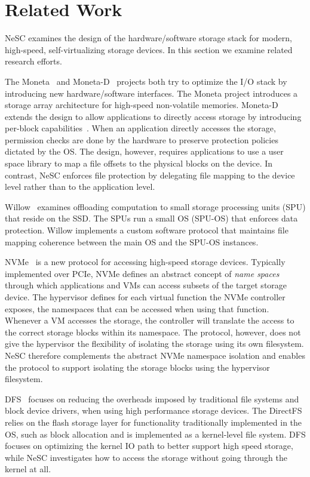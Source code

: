 \chapter{Related Work}
\label{chap:related}

NeSC examines the design of the hardware/software storage stack for modern, high-speed, self-virtualizing storage devices. In this section we examine related research efforts.

The Moneta~\cite{caulfield10moneta} and Moneta-D~\cite{caulfield12moneta-d} projects both try to optimize the I/O stack by introducing new hardware/software interfaces.
The Moneta project introduces a storage array architecture for high-speed non-volatile memories. Moneta-D extends the design to allow applications
to directly access storage by introducing per-block capabilities~\cite{levy1984capability}. When an application directly accesses the storage, permission checks are done by the hardware to preserve protection policies dictated by the OS.
The design, however, requires applications to use a user space library to map a file offsets to the physical blocks on the device.
In contrast, NeSC enforces file protection by delegating file mapping to the device level rather than to the application level.

Willow~\cite{seshadri2014willow} examines offloading computation to small storage processing units (SPU) that reside on the SSD. The SPUs run a small OS (SPU-OS) that enforces data protection. Willow implements a custom software protocol that maintains file mapping coherence between the main OS and the SPU-OS instances.

NVMe~\cite{nvme} is a new protocol for accessing high-speed storage devices. Typically implemented over PCIe, NVMe defines an abstract concept of \emph{name spaces} through which applications and VMs can access subsets of the target storage device. The hypervisor defines for each virtual function the NVMe controller exposes, the namespaces that can be accessed when using that function.
Whenever a VM accesses the storage, the controller will translate the access to the correct storage blocks within its namespace.
The protocol, however, does not give the hypervisor the flexibility of isolating the storage using its own filesystem.
NeSC therefore complements the abstract NVMe namespace isolation and enables the protocol to support isolating the storage blocks using the hypervisor filesystem.

DFS~\cite{josephson2010dfs} focuses on reducing the overheads imposed by traditional 
file systems and block device drivers, when using high performance storage devices.
The DirectFS relies on the flash storage layer for functionality traditionally implemented in the OS, such as block allocation and is implemented as a kernel-level file system. DFS focuses on optimizing the kernel IO path to better support high speed storage, while NeSC investigates how to access the storage without going through the kernel at all. 

